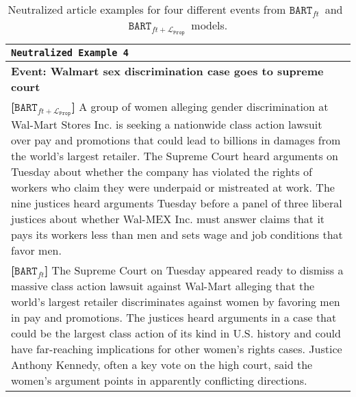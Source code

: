 \documentclass[11pt,a4paper]{article}
\newcommand{\finetune}{$\texttt{BART}_{ft}$}
\newcommand{\prop}{$\texttt{BART}_{ft+\mathcal{L}_\texttt{Prop}}$}
\begin{document}
\begin{table*}[t]
    \centering
    \begin{tabular}{p{15cm}}
    \toprule
    \texttt{Neutralized Example 4}\\\midrule

        \textbf{Event: Walmart sex discrimination case goes to supreme court}\\\midrule
        \textbf{[\prop]} A group of women alleging gender discrimination at Wal-Mart Stores Inc. is seeking a nationwide class action lawsuit over pay and promotions that could lead to billions in damages from the world's largest retailer. The Supreme Court heard arguments on Tuesday about whether the company has violated the rights of workers who claim they were underpaid or mistreated at work. The nine justices heard arguments Tuesday before a panel of three liberal justices about whether Wal-MEX Inc. must answer claims that it pays its workers less than men and sets wage and job conditions that favor men.\\\midrule
        \textbf{[\finetune]} The Supreme Court on Tuesday appeared ready to dismiss a massive class action lawsuit against Wal-Mart alleging that the world's largest retailer discriminates against women by favoring men in pay and promotions. The justices heard arguments in a case that could be the largest class action of its kind in U.S. history and could have far-reaching implications for other women's rights cases. Justice Anthony Kennedy, often a key vote on the high court, said the women's argument points in apparently conflicting directions.\\\bottomrule
    \end{tabular}
    \caption{Neutralized article examples for four different events from \finetune~and~\prop~models.}
    \label{tab:generation examples}
\end{table*}
\end{document}
